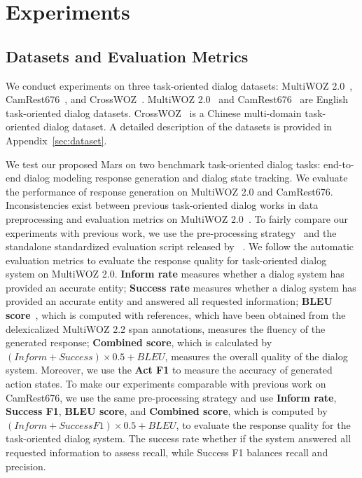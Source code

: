 \section{Experiments}  
\label{sec:experiments}
\subsection{Datasets and Evaluation Metrics}
\label{sec:evaluation}
We conduct experiments on three task-oriented dialog datasets: MultiWOZ 2.0~\cite{budzianowski-etal-2018-multiwoz},  CamRest676~\cite{wen-etal-2017-network}, and CrossWOZ~\cite{zhu-etal-2020-crosswoz}. 
MultiWOZ 2.0~\cite{budzianowski-etal-2018-multiwoz} and CamRest676~\cite{wen-etal-2017-network} are English task-oriented dialog datasets. 
CrossWOZ~\cite{zhu-etal-2020-crosswoz} is a Chinese multi-domain task-oriented dialog dataset.
A detailed description  of the datasets is provided in Appendix~\ref{sec:dataset}.

We test our proposed Mars on two benchmark task-oriented dialog tasks: end-to-end dialog modeling response generation  and dialog state tracking. We evaluate the performance of response generation on MultiWOZ 2.0 and CamRest676.
Inconsistencies exist between previous task-oriented dialog works  in data preprocessing and evaluation metrics on  MultiWOZ 2.0~\cite{nekvinda-dusek-2021-shades}.
To fairly compare  our experiments with previous work,  we use the pre-processing strategy~\cite{DBLP:conf/aaai/ZhangOY20} and  the standalone standardized evaluation script released by ~\citet{nekvinda-dusek-2021-shades}. We follow the automatic evaluation metrics to evaluate the response quality for  task-oriented dialog system on MultiWOZ 2.0.
\textbf{Inform  rate} measures whether  a dialog system has provided an accurate entity; \textbf{Success rate} measures whether a dialog system has provided an accurate entity and answered all requested information; \textbf{BLEU score}~\cite{papineni-etal-2002-bleu}, which is computed with references, which have been obtained from the delexicalized MultiWOZ 2.2 span annotations, measures  the fluency of the generated response; \textbf{Combined score}, which is calculated  by $ (Inform + Success) \times 0.5 + BLEU$, measures the overall quality of the dialog system. Moreover, we use the \textbf{Act F1} to measure the accuracy of generated action states.
To make our experiments comparable with previous work \cite{zhang-etal-2020-probabilistic,DBLP:journals/corr/abs-2111-14592} on CamRest676,
we use the same pre-processing strategy and use \textbf{Inform  rate}, \textbf{Success F1}, \textbf{BLEU score}, and \textbf{Combined score}, which is computed by $ (Inform + Success F1) \times 0.5 + BLEU$, to evaluate the response quality for the task-oriented dialog system. The  success rate
whether if the system answered all requested
information to assess  recall, while Success F1 balances recall and precision.

